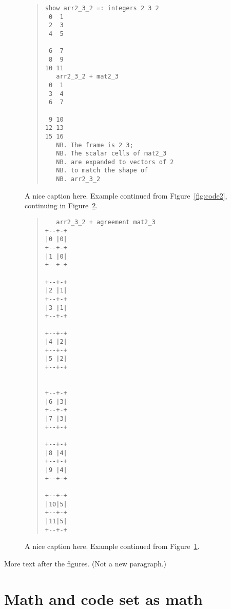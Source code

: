 %
\begin{figure}[p]
\begin{quote}
\begin{singlespacing}
\begin{small}
\begin{verbatim}
show arr2_3_2 =: integers 2 3 2
 0  1
 2  3
 4  5

 6  7
 8  9
10 11
   arr2_3_2 + mat2_3
 0  1
 3  4
 6  7

 9 10
12 13
15 16
   NB. The frame is 2 3;
   NB. The scalar cells of mat2_3
   NB. are expanded to vectors of 2
   NB. to match the shape of
   NB. arr2_3_2
\end{verbatim}
\end{small}
\end{singlespacing}
\end{quote}
\caption{A nice caption here.  
Example continued from Figure~\ref{fig:code2},
continuing in Figure~\ref{fig:code4}.}
\label{fig:code3}
\end{figure}
%
\begin{figure}[p]
\begin{quote}
\begin{singlespacing}
\begin{small}
\begin{verbatim}
   arr2_3_2 + agreement mat2_3
+--+-+
|0 |0|
+--+-+
|1 |0|
+--+-+

+--+-+
|2 |1|
+--+-+
|3 |1|
+--+-+

+--+-+
|4 |2|
+--+-+
|5 |2|
+--+-+


+--+-+
|6 |3|
+--+-+
|7 |3|
+--+-+

+--+-+
|8 |4|
+--+-+
|9 |4|
+--+-+

+--+-+
|10|5|
+--+-+
|11|5|
+--+-+
\end{verbatim}
\end{small}
\end{singlespacing}
\end{quote}
\caption{A nice caption here.  
Example continued from Figure~\ref{fig:code3}.}
\label{fig:code4}
\end{figure}
%
More text after the figures.  (Not a new paragraph.)

\section{Math and code set as math}

